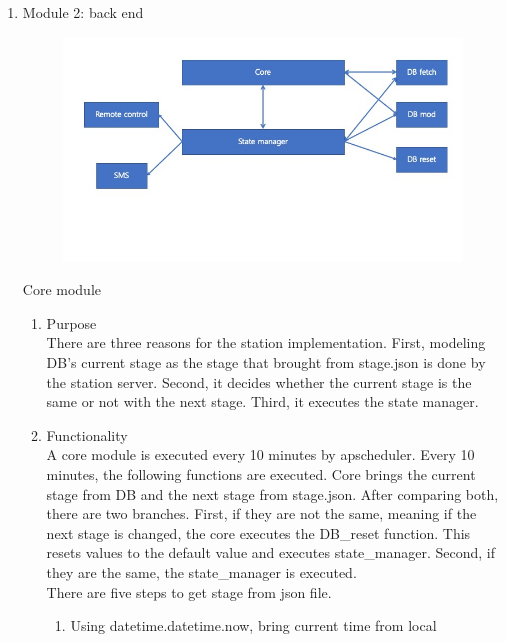 \documentclass[conference]{IEEEtran}
\begin{document}
\begin{enumerate}[label=\arabic*.]
\begin{enumerate}[label=\arabic*.]
\begin{enumerate}[label=\alph*.]
\begin{enumerate}[label=\roman*.]
        \end{enumerate}
    \end{enumerate}
    \item {\large{Module 2: back end}} \\ 
    \begin{figure}[H]\centering \includegraphics[scale=0.3]{images/flowchart.jpeg}\end{figure} 
    \begin{center}\large{Core module}\end{center} 
    \begin{enumerate}[label=\alph*.]
        \item {\large{Purpose}}\\
        There are three reasons for the station implementation. First, modeling DB’s current stage as the stage that brought from stage.json is done by the station server. Second, it decides whether the current stage is the same or not with the next stage. Third, it executes the state manager.\\
        \item {\large{Functionality}}\\
        A core module is executed every 10 minutes by apscheduler. Every 10 minutes, the following functions are executed. Core brings the current stage from DB and the next stage from stage.json. After comparing both, there are two branches. First, if they are not the same, meaning if the next stage is changed, the core executes the DB\_reset function. This resets values to the default value and executes state\_manager. Second, if they are the same, the state\_manager is executed. \\
        There are five steps to get stage from json file. 
        \begin{enumerate}[label=\roman*.]
            \item {\large{Using datetime.datetime.now, bring current time from local}}

\end{enumerate}
\end{enumerate}
\end{enumerate}
\end{enumerate}
\end{document}
